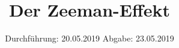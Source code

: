 

\subject{VERSUCH NUMMER 27}
\title{Der Zeeman-Effekt}
\date{
  Durchführung: 20.05.2019
  \hspace{3em}
  Abgabe: 23.05.2019
}



\thispagestyle{empty}
\maketitle
\thispagestyle{empty}
\tableofcontents
\newpage
\setcounter{page}{1}


% 




\nocite{*}
\printbibliography



